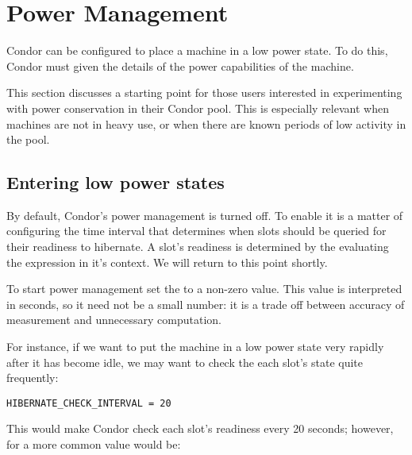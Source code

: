 \section{\label{sec:power-man}Power Management}



Condor can be configured to place a machine in a low power state.  
To do this, Condor must given the details of the power capabilities 
of the machine. 

This section discusses a starting point for those users interested in 
experimenting with power conservation in their Condor pool.  This is 
especially relevant when machines are not in heavy use, or when there 
are known periods of low activity in the pool.

\subsection{Entering low power states}

By default, Condor's power management is turned off.  To enable it is a matter
of configuring the time interval that determines when slots should be queried
for their readiness to hibernate.  A slot's readiness is determined by the 
evaluating the  expression in it's context.  We will return 
to this point shortly.

To start power management set the  to a
non-zero value.  This value is interpreted in seconds, so it need not 
be a small number: it is a trade off between accuracy of measurement and 
unnecessary computation.  

For instance, if we want to put the machine in a low power state very rapidly
after it has become idle, we may want to check the each slot's state quite
frequently:

\begin{verbatim}
HIBERNATE_CHECK_INTERVAL = 20
\end{verbatim}

This would make Condor check each slot's readiness every 20 seconds; however,
for a more common value would be:

